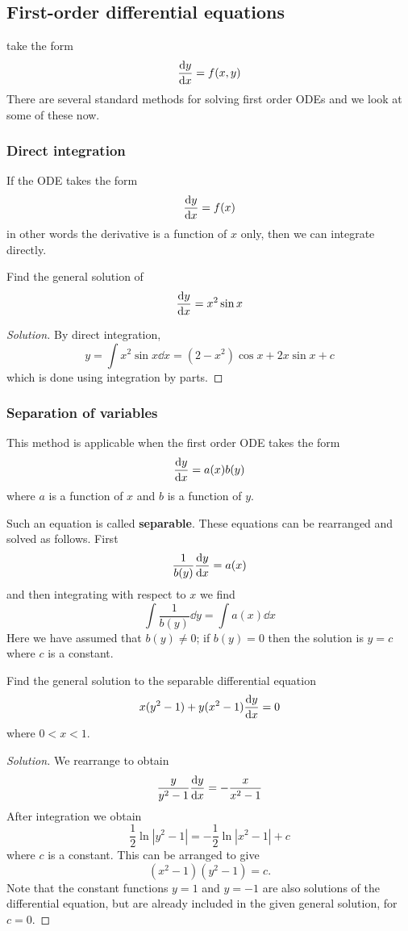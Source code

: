 \subsection{First-order differential equations}
 take the form
\[ \dv{y}{x} = f(x,y) \]
There are several standard methods for solving first order ODEs and we look at some of these now.

\subsubsection{Direct integration}
If the ODE takes the form
\[ \dv{y}{x} = f(x) \]
in other words the derivative is a function of $x$ only, then we can integrate directly.

\begin{exmp}{}{}
Find the general solution of
\[ \dv{y}{x} = x^2\sin x \]
\end{exmp}

\begin{proof}[Solution]
By direct integration,
\[ y = \int x^2\sin x \dd{x} = (2-x^2) \cos x + 2x \sin x + c \]
which is done using integration by parts.
\end{proof}

\subsubsection{Separation of variables}
This method is applicable when the first order ODE takes the form
\[ \dv{y}{x} = a(x)b(y) \]
where $a$ is a function of $x$ and $b$ is a function of $y$. 

Such an equation is called \textbf{separable}. These equations can be rearranged and solved as follows. First
\[ \frac{1}{b(y)}\dv{y}{x} = a(x) \]
and then integrating with respect to $x$ we find
\[ \int \frac{1}{b(y)} \dd{y} = \int a(x) \dd{x} \]
Here we have assumed that $b(y) \neq 0$; if $b(y) = 0$ then the solution is $y = c$ where $c$ is a constant.

\begin{exmp}{}{}
Find the general solution to the separable differential equation
\[ x(y^2-1) + y(x^2-1)\dv{y}{x} = 0 \]
where $0<x<1$.
\end{exmp}

\begin{proof}[Solution]
We rearrange to obtain
\[ \frac{y}{y^2-1}\dv{y}{x} = -\frac{x}{x^2-1} \]
After integration we obtain
\[ \frac{1}{2}\ln|y^2-1| = -\frac{1}{2}\ln|x^2-1| + c \]
where $c$ is a constant. This can be arranged to give
\[ (x^2-1)(y^2-1) = c. \]
Note that the constant functions $y=1$ and $y=-1$ are also solutions of the differential equation, but are already included in the given general solution, for $c=0$.
\end{proof}

